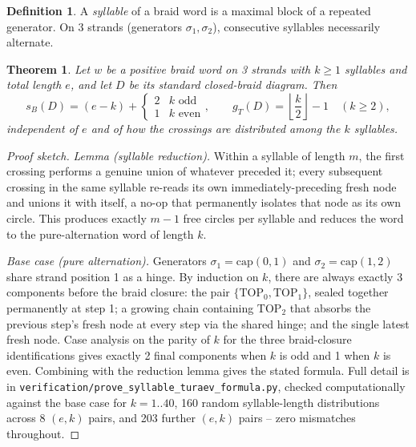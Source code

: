 \documentclass[11pt]{article}
\newtheorem{theorem}{Theorem}
\theoremstyle{definition}
\newtheorem{definition}{Definition}
\begin{document}
\begin{definition}
A \emph{syllable} of a braid word is a maximal block of a repeated generator. On 3 strands (generators $\sigma_1, \sigma_2$), consecutive syllables necessarily alternate.
\end{definition}

\begin{theorem}
\label{thm:syllable}
Let $w$ be a positive braid word on 3 strands with $k \geq 1$ syllables and total length $e$, and let $D$ be its standard closed-braid diagram. Then
\[
s_B(D) = (e-k) + \begin{cases} 2 & k \text{ odd} \\ 1 & k \text{ even} \end{cases}, \qquad
g_T(D) = \left\lfloor \frac{k}{2} \right\rfloor - 1 \quad (k \geq 2),
\]
independent of $e$ and of how the crossings are distributed among the $k$ syllables.
\end{theorem}

\begin{proof}[Proof sketch]
\emph{Lemma (syllable reduction).} Within a syllable of length $m$, the first crossing performs a genuine union of whatever preceded it; every subsequent crossing in the same syllable re-reads its own immediately-preceding fresh node and unions it with itself, a no-op that permanently isolates that node as its own circle. This produces exactly $m-1$ free circles per syllable and reduces the word to the pure-alternation word of length $k$.

\emph{Base case (pure alternation).} Generators $\sigma_1 = \text{cap}(0,1)$ and $\sigma_2 = \text{cap}(1,2)$ share strand position 1 as a hinge. By induction on $k$, there are always exactly 3 components before the braid closure: the pair $\{\mathrm{TOP}_0, \mathrm{TOP}_1\}$, sealed together permanently at step 1; a growing chain containing $\mathrm{TOP}_2$ that absorbs the previous step's fresh node at every step via the shared hinge; and the single latest fresh node. Case analysis on the parity of $k$ for the three braid-closure identifications gives exactly 2 final components when $k$ is odd and 1 when $k$ is even. Combining with the reduction lemma gives the stated formula. Full detail is in \texttt{verification/prove\_syllable\_turaev\_formula.py}, checked computationally against the base case for $k=1..40$, 160 random syllable-length distributions across 8 $(e,k)$ pairs, and 203 further $(e,k)$ pairs -- zero mismatches throughout.
\end{proof}
\end{document}
